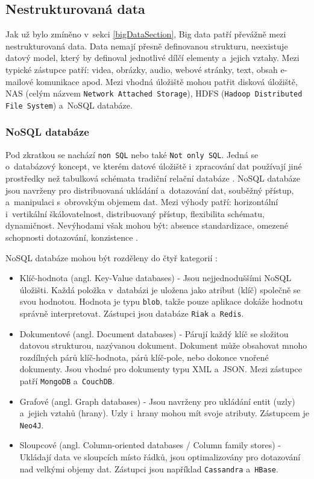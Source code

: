 \subsection{Nestrukturovaná data}
Jak už bylo zmíněno v~sekci \ref{bigDataSection}, Big data patří převážně mezi nestrukturovaná data. Data nemají přesně definovanou strukturu, neexistuje datový model, který by definoval jednotlivé dílčí elementy a~jejich vztahy. Mezi typické zástupce patří: videa, obrázky, audio, webové stránky, text, obsah e-mailové komunikace apod. Mezi vhodná úložiště mohou patřit disková úložiště, NAS (celým názvem \texttt{Network Attached Storage}), HDFS (\texttt{Hadoop Distributed File System}) a~NoSQL databáze.

\subsubsection{NoSQL databáze}
Pod zkratkou se nachází \texttt{non SQL} nebo také \texttt{Not only SQL}. Jedná se o~databázový koncept, ve kterém datové úložiště i~zpracování dat používají jiné prostředky než tabulková schémata tradiční relační databáze \cite{noSqlWiki}. NoSQL databáze jsou navrženy pro distribuovaná ukládání a~dotazování dat, souběžný přístup, a~manipulaci s~obrovským objemem dat. Mezi výhody patří: horizontální i~vertikální škálovatelnost, distribuovaný přístup, flexibilita schématu, dynamičnost. Nevýhodami však mohou být: absence standardizace, omezené schopnosti dotazování, konzistence \cite{noSqlIntro}.

\vspace{0.5cm}
\noindent NoSQL databáze mohou být rozděleny do čtyř kategorií \cite{noSqlOverview}:
\begin{itemize}
    \item Klíč-hodnota (angl. Key-Value databases) - Jsou nejjednoduššími NoSQL úložišti. Každá položka v~databázi je uložena jako atribut (klíč) společně se svou hodnotou. Hodnota je typu \texttt{blob}, takže pouze aplikace dokáže hodnotu správně interpretovat. Zástupci jsou databáze \texttt{Riak} a~\texttt{Redis}.
    
    \item Dokumentové (angl. Document databases) - Párují každý klíč se složitou datovou strukturou, nazývanou dokument. Dokument může obsahovat mnoho rozdílných párů klíč-hodnota, párů klíč-pole, nebo dokonce vnořené dokumenty. Jsou vhodné pro dokumenty typu XML a~JSON. Mezi zástupce patří \texttt{MongoDB} a~\texttt{CouchDB}.
    
    \item Grafové (angl. Graph databases) - Jsou navrženy pro ukládání entit (uzly) a~jejich vztahů (hrany). Uzly i~hrany mohou mít svoje atributy. Zástupcem je \texttt{Neo4J}.
    
    \item Sloupcové (angl. Column-oriented databases / Column family stores) - Ukládají data ve sloupcích místo řádků, jsou optimalizovány pro dotazování nad velkými objemy dat. Zástupci jsou například \texttt{Cassandra} a~\texttt{HBase}.
\end{itemize}

